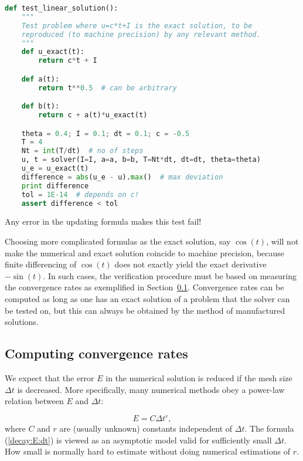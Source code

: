 \documentclass[graybox,sectrefs,envcountresetchap,open=right,final]{svmonodo}
\begin{document}
\begin{lstlisting}[language=Python,style=blue1_bluegreen]
def test_linear_solution():
    """
    Test problem where u=c*t+I is the exact solution, to be
    reproduced (to machine precision) by any relevant method.
    """
    def u_exact(t):
        return c*t + I

    def a(t):
        return t**0.5  # can be arbitrary

    def b(t):
        return c + a(t)*u_exact(t)

    theta = 0.4; I = 0.1; dt = 0.1; c = -0.5
    T = 4
    Nt = int(T/dt)  # no of steps
    u, t = solver(I=I, a=a, b=b, T=Nt*dt, dt=dt, theta=theta)
    u_e = u_exact(t)
    difference = abs(u_e - u).max()  # max deviation
    print difference
    tol = 1E-14  # depends on c!
    assert difference < tol
\end{lstlisting}
Any error in the updating formula makes this test fail!

Choosing more complicated formulas as the exact solution, say
$\cos(t)$, will not make the numerical and exact solution
coincide to machine precision, because finite differencing of
$\cos(t)$ does not exactly yield the exact derivative $-\sin(t)$.
In such cases, the verification procedure
must be based on measuring the convergence rates as exemplified in
Section~\ref{decay:convergence:rate}. Convergence rates can be
computed as long as one has
an exact solution of a problem that the solver can be tested on, but
this can always be obtained by the method of manufactured solutions.


\subsection{Computing convergence rates}
\label{decay:convergence:rate}


We expect that the error $E$ in the numerical solution is
reduced if the mesh size $\Delta t$ is decreased. More specifically,
many numerical methods obey a power-law relation between $E$ and
$\Delta t$:

\begin{equation}
E = C\Delta t^r,
\label{decay:E:dt}
\end{equation}
where $C$ and $r$ are (usually unknown) constants independent of $\Delta t$.
The formula (\ref{decay:E:dt}) is viewed as an asymptotic model valid for
sufficiently small $\Delta t$. How small is normally hard to estimate
without doing numerical estimations of $r$.
\end{document}
